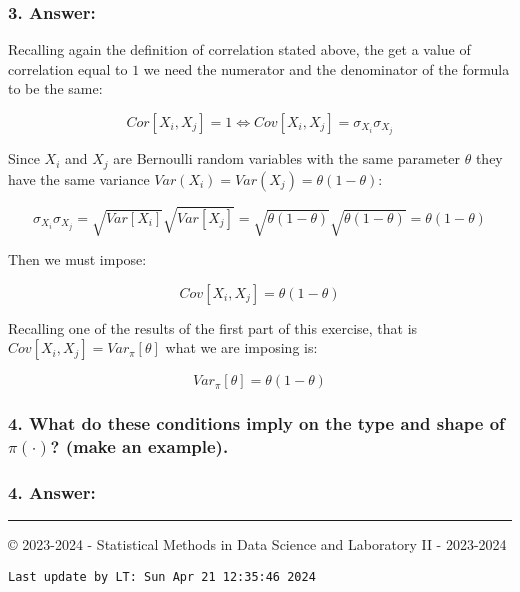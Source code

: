 \documentclass[
]{article}
\begin{document}
\hypertarget{answer-7}{%
\subsubsection{3. Answer:}\label{answer-7}}

Recalling again the definition of correlation stated above, the get a
value of correlation equal to \(1\) we need the numerator and the
denominator of the formula to be the same:

\[
Cor[X_i, X_j] = 1 \iff  Cov[X_i, X_j] = \sigma_{X_i}\sigma_{X_j}
\]

Since \(X_i\) and \(X_j\) are Bernoulli random variables with the same
parameter \(\theta\) they have the same variance
\(Var(X_i) = Var(X_j) = \theta(1 - \theta)\):

\[
\sigma_{X_i}\sigma_{X_j} = \sqrt{Var[X_i]}\sqrt{Var[X_j]} = 
\sqrt{\theta(1 - \theta)} \sqrt{\theta(1 - \theta)} =
\theta(1 - \theta)
\]

Then we must impose:

\[
Cov[X_i, X_j] = \theta(1 - \theta)
\]

Recalling one of the results of the first part of this exercise, that is
\(Cov[X_i, X_j] = Var_\pi[\theta]\) what we are imposing is:

\[
Var_\pi[\theta] = \theta(1 - \theta)
\]

\hypertarget{what-do-these-conditions-imply-on-the-type-and-shape-of-picdot-make-an-example.}{%
\subsubsection{\texorpdfstring{4. What do these conditions imply on the
type and shape of \(\pi(\cdot)\)? (make an
example).}{4. What do these conditions imply on the type and shape of \textbackslash pi(\textbackslash cdot)? (make an example).}}\label{what-do-these-conditions-imply-on-the-type-and-shape-of-picdot-make-an-example.}}

\hypertarget{answer-8}{%
\subsubsection{4. Answer:}\label{answer-8}}

\vspace{10.5cm}

\begin{center}\rule{0.5\linewidth}{0.5pt}\end{center}

© 2023-2024 - Statistical Methods in Data Science and Laboratory II -
2023-2024

\begin{verbatim}
Last update by LT: Sun Apr 21 12:35:46 2024
\end{verbatim}
\end{document}
